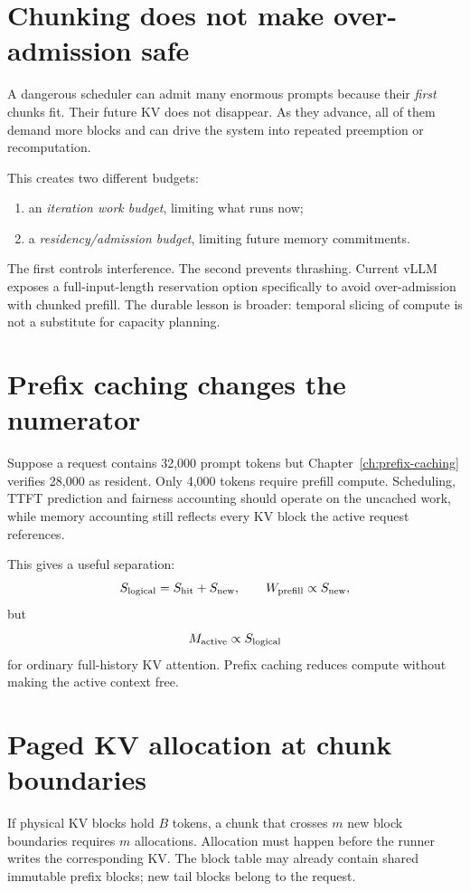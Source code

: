 \section{Chunking does not make over-admission safe}

A dangerous scheduler can admit many enormous prompts because their \emph{first}
chunks fit. Their future KV does not disappear. As they advance, all of them demand
more blocks and can drive the system into repeated preemption or recomputation.

This creates two different budgets:
\begin{enumerate}
\item an \emph{iteration work budget}, limiting what runs now;
\item a \emph{residency/admission budget}, limiting future memory commitments.
\end{enumerate}
The first controls interference. The second prevents thrashing. Current vLLM exposes
a full-input-length reservation option specifically to avoid over-admission with
chunked prefill. The durable lesson is broader: temporal slicing of compute is not a
substitute for capacity planning.

\section{Prefix caching changes the numerator}

Suppose a request contains 32,000 prompt tokens but Chapter~\ref{ch:prefix-caching}
verifies 28,000 as resident. Only 4,000 tokens require prefill compute. Scheduling,
TTFT prediction and fairness accounting should operate on the uncached work, while
memory accounting still reflects every KV block the active request references.

This gives a useful separation:
\[
S_{\rm logical}=S_{\rm hit}+S_{\rm new},\qquad
W_{\rm prefill}\propto S_{\rm new},
\]
but
\[
M_{\rm active}\propto S_{\rm logical}
\]
for ordinary full-history KV attention. Prefix caching reduces compute without making
the active context free.

\section{Paged KV allocation at chunk boundaries}

If physical KV blocks hold $B$ tokens, a chunk that crosses $m$ new block boundaries
requires $m$ allocations. Allocation must happen before the runner writes the
corresponding KV. The block table may already contain shared immutable prefix blocks;
new tail blocks belong to the request.

